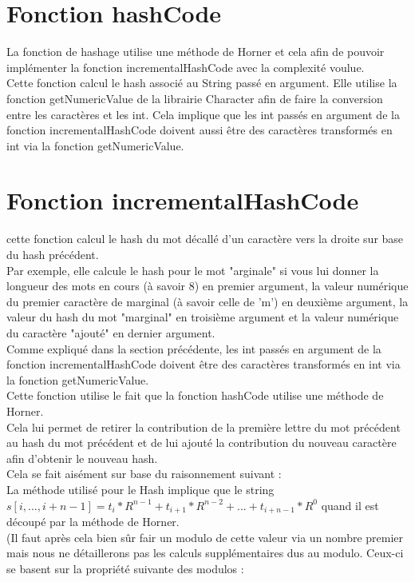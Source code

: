 \documentclass[11pt, frenchb]{article}
\begin{document}
\section{Fonction hashCode}
La fonction de hashage utilise une méthode de Horner et cela afin de pouvoir implémenter la fonction incrementalHashCode avec la complexité voulue.\\
Cette fonction calcul le hash associé au String passé en argument. Elle utilise la fonction getNumericValue de la librairie Character afin de faire la conversion entre les caractères et les int. Cela implique que les int passés en argument de la fonction incrementalHashCode doivent aussi être des caractères transformés en int via la fonction getNumericValue.

\section{Fonction incrementalHashCode}
cette fonction calcul le hash du mot décallé d'un caractère vers la droite sur base du hash précédent.\\
Par exemple, elle calcule le hash pour le mot "arginale" si vous lui donner la longueur des mots en cours (à savoir 8) en premier argument, la valeur numérique du premier caractère de marginal (à savoir celle de 'm') en deuxième argument, la valeur du hash du mot "marginal" en troisième argument et la valeur numérique du caractère "ajouté" en dernier argument.\\ 
Comme expliqué dans la section précédente, les int passés en argument de la fonction incrementalHashCode doivent être des caractères transformés en int via la fonction getNumericValue.\\
Cette fonction utilise le fait que la fonction hashCode utilise une méthode de Horner.\\Cela lui permet de retirer la contribution de la première lettre du mot précédent au hash du mot précédent et de lui ajouté la contribution du nouveau caractère afin d'obtenir le nouveau hash.\\
Cela se fait aisément sur base du raisonnement suivant :\\
La méthode utilisé pour le Hash implique que le string $ s[i,..., i+n-1] = t_i*R^{n-1} + t_{i+1}*R^{n-2}+...+t_{i+n-1}*R^0 $ quand il est découpé par la méthode de Horner.\\
(Il faut après cela bien sûr fair un modulo de cette valeur via un nombre premier 
mais nous ne détaillerons pas les calculs supplémentaires dus au modulo. Ceux-ci se basent sur la propriété suivante des modulos :\\
\end{document}
